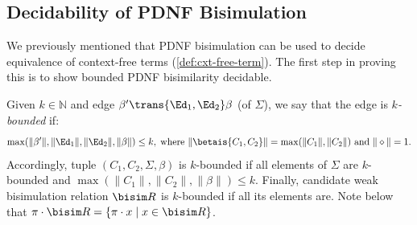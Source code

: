 

\subsection{Decidability of PDNF Bisimulation}\label{sec:decidability}

We previously mentioned  that PDNF bisimulation can be used to decide equivalence of context-free terms {(\cref{def:cxt-free-term})}. The first step in proving this is to show {bounded} PDNF bisimilarity decidable.

Given $k\in\mathbb N$ and edge $\beta'\trans{\Ed_1,\Ed_2}\beta$ (of $\Sigma$), we say that the edge is \emph{$k$-bounded} if:
\[ \max(\|\beta'\|,\|\Ed_1\|,\|\Ed_2\|,\|\beta\|)\leq k,\;\text{where }\|\betais{C_1,C_2}\|=\max(\|C_1\|,\|C_2\|)\text{ and }\|\diamond\|=1.
\]
Accordingly, 
tuple $(C_1,C_2,\Sigma,\beta)$ is {$k$-bounded} if all elements of $\Sigma$ are $k$-bounded and
$ \max(\|C_1\|,\|C_2\|,\|\beta\|)\leq k$. Finally, candidate weak bisimulation relation $\bisim R$ is $k$-bounded if all its elements are. Note below that $\pi\cdot\bisim R=\{\pi\cdot x\mid x\in\bisim R\}$.

